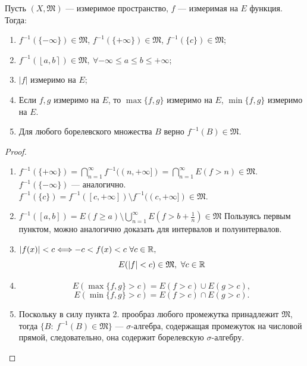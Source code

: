 \begin{lemma}
    Пусть $(X, \mathfrak{M})$ — измеримое пространство, $f$ — измеримая на $E$ функция.
    Тогда:
    \begin{enumerate}
        \item $f^{-1}(\{-\infty\}) \in \mathfrak{M}$, $f^{-1}(\{+\infty\}) \in \mathfrak{M}$, $f^{-1}(\{c\}) \in \mathfrak{M}$;
        \item $f^{-1}(\left\lfloor a, b\right\rceil ) \in \mathfrak{M}, \ \forall - \infty \leqslant a \leqslant b \leqslant + \infty$;
        \item $|f|$ измеримо на $E$;
        \item Если $f, g$ измеримо на $E$, то
        $\max\{f,g\}$ измеримо на $E$,
        $\min\{f,g\}$ измеримо на $E$.
        \item Для любого борелевского множества $B$ верно $f^{-1}(B) \in \mathfrak{M}$.
    \end{enumerate}
\end{lemma} 
\begin{proof}\tab

    \begin{enumerate}
        \item $f^{-1}(\{+\infty\}) = \bigcap\limits_{n=1}^{\infty} f^{-1}((n, +\infty]) = \bigcap\limits_{n=1}^{\infty} E(f > n) \in \mathfrak{M}$.
        $f^{-1}(\{-\infty\})$ — аналогично.
        $f^{-1}(\{c\}) = f^{-1}([c, +\infty]) \setminus f^{-1}((c, +\infty]) \in \mathfrak{M}$.

        \item $f^{-1}([a,b]) = E(f \geqslant a) \setminus \bigcup\limits_{n=1}^{\infty} E(f > b + \frac{1}{n}) \in \mathfrak{M}$
        Пользуясь первым пунктом, можно аналогично доказать для интервалов и полуинтервалов.

        \item $|f(x)| < c \Longleftrightarrow -c < f(x) < c \ \forall c \in \mathbb{R},$
        \[E(|f| < c) \in \mathfrak{M}, \ \forall c \in \mathbb{R}\]

        \item $$E(\max\{f,g\} > c) = E(f > c) \cup E(g > c),$$
        $$E(\min\{f,g\} > c) = E(f>c) \cap E(g>c).$$

        \item Поскольку в силу пункта 2. прообраз любого промежутка принадлежит $\mathfrak{M}$, тогда $\{B: \ f^{-1}(B) \in \mathfrak{M}\}$ — $\sigma$-алгебра, содержащая промежуток на числовой прямой, следовательно, она содержит борелевскую $\sigma$-алгебру.
    \end{enumerate}
\end{proof} 

